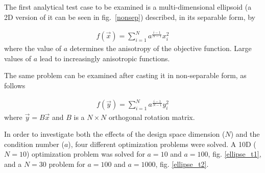 The first analytical test case to be examined is a multi-dimensional ellipsoid (a 2D version of it can be seen in fig.\ \ref{nonsep}) described, in its separable form, by   


\begin{eqnarray}
   f(\vec{x})=\sum^{N}_{i=1} a^{\frac{i-1}{N-1}}x_i^2
   \label{ellipse} 
\end{eqnarray}
where the value of $a$ determines the anisotropy of the objective function. Large values of $a$ lead to increasingly anisotropic functions.

The same problem can be examined after casting it in non-separable form, as follows

\begin{eqnarray}
   f(\vec{y})=\sum^{N}_{i=1}a^{\frac{i-1}{N-1}}y_i^2
   \label{ellipse} 
\end{eqnarray}
where $\vec{y}=B\vec{x}$ and $B$ is a $N\times N$ orthogonal rotation matrix.

In order to investigate both the effects of the design space dimension ($N$) and the condition number ($a$), four different optimization problems were solved. A 10D ($N\!=\!10$) optimization problem was solved for $a\!=\!10$ and $a\!=\!100$,  fig. \ref{ellipse_t1}, and a $N\!=\!30$ problem for $a\!=\!100$ and $a\!=\!1000$, fig. \ref{ellipse_t2}. 


